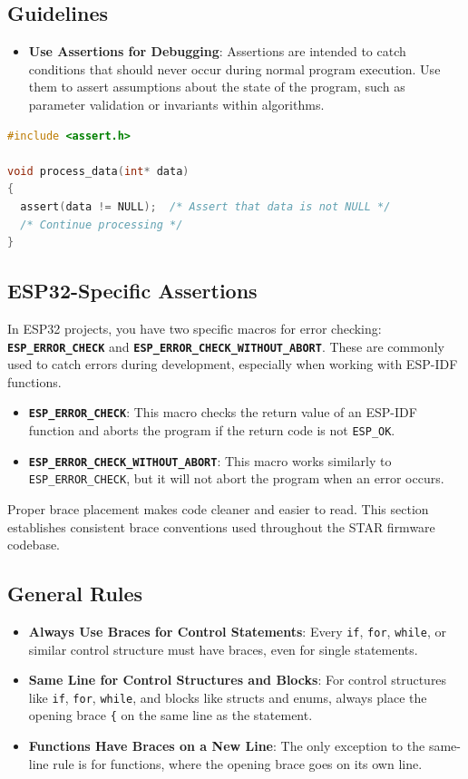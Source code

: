 \subsection{Guidelines}
\begin{itemize}
    \item \textbf{Use Assertions for Debugging}: Assertions are intended to catch conditions that should never occur during normal program execution. Use them to assert assumptions about the state of the program, such as parameter validation or invariants within algorithms.
\end{itemize}
\begin{lstlisting}[language=C]
#include <assert.h>

void process_data(int* data)
{
  assert(data != NULL);  /* Assert that data is not NULL */
  /* Continue processing */
}
\end{lstlisting}

\subsection{ESP32-Specific Assertions}
In ESP32 projects, you have two specific macros for error checking: \textbf{\texttt{ESP\_ERROR\_CHECK}} and \textbf{\texttt{ESP\_ERROR\_CHECK\_WITHOUT\_ABORT}}. These are commonly used to catch errors during development, especially when working with ESP-IDF functions.

\begin{itemize}
    \item \textbf{\texttt{ESP\_ERROR\_CHECK}}: This macro checks the return value of an ESP-IDF function and aborts the program if the return code is not \texttt{ESP\_OK}.
    \item \textbf{\texttt{ESP\_ERROR\_CHECK\_WITHOUT\_ABORT}}: This macro works similarly to \texttt{ESP\_ERROR\_CHECK}, but it will not abort the program when an error occurs.
\end{itemize}


Proper brace placement makes code cleaner and easier to read. This section establishes consistent brace conventions used throughout the STAR firmware codebase.

\subsection{General Rules}

\begin{itemize}
    \item \textbf{Always Use Braces for Control Statements}: Every \texttt{if}, \texttt{for}, \texttt{while}, or similar control structure must have braces, even for single statements.
    \item \textbf{Same Line for Control Structures and Blocks}: For control structures like \texttt{if}, \texttt{for}, \texttt{while}, and blocks like structs and enums, always place the opening brace \texttt{\{} on the same line as the statement.
    \item \textbf{Functions Have Braces on a New Line}: The only exception to the same-line rule is for functions, where the opening brace goes on its own line.
\end{itemize}

